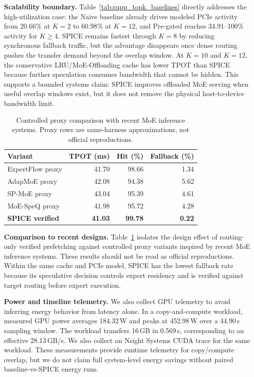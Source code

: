 \textbf{Scalability boundary.}
Table~\ref{tab:supp_topk_baselines} directly addresses the high-utilization
case: the Naive baseline already drives modeled PCIe activity from 20.66\% at
$K{=}2$ to 60.98\% at $K{=}12$, and Pre-gated reaches 34.91--100\% activity for
$K{\ge}4$. SPICE remains fastest through $K{=}8$ by reducing synchronous
fallback traffic, but the advantage disappears once dense routing pushes the
transfer demand beyond the overlap window. At $K{=}10$ and $K{=}12$, the
conservative LRU/MoE-Offloading cache has lower TPOT than SPICE because further
speculation consumes bandwidth that cannot be hidden. This supports a bounded
systems claim: SPICE improves offloaded MoE serving when useful overlap windows
exist, but it does not remove the physical host-to-device bandwidth limit.

\begin{table}[t]
\centering
\caption{Controlled proxy comparison with recent MoE inference systems. Proxy
rows are same-harness approximations, not official reproductions.}
\label{tab:supp_proxy}
\scriptsize
\begin{tabular}{lrrr}
\toprule
Variant & TPOT (ms) & Hit (\%) & Fallback (\%) \\
\midrule
ExpertFlow proxy & 41.70 & 98.66 & 1.34 \\
AdapMoE proxy & 42.08 & 94.38 & 5.62 \\
SP-MoE proxy & 43.04 & 95.39 & 4.61 \\
MoE-SpeQ proxy & 41.98 & 95.72 & 4.28 \\
\textbf{SPICE verified} & \textbf{41.03} & \textbf{99.78} & \textbf{0.22} \\
\bottomrule
\end{tabular}
\end{table}

\textbf{Comparison to recent designs.}
Table~\ref{tab:supp_proxy} isolates the design effect of routing-only verified
prefetching against controlled proxy variants inspired by recent MoE inference
systems. These results should not be read as official reproductions. Within the
same cache and PCIe model, SPICE has the lowest fallback rate because its
speculative decision controls expert residency and is verified against target
routing before expert execution.

\textbf{Power and timeline telemetry.}
We also collect GPU telemetry to avoid inferring energy behavior from latency
alone. In a copy-and-compute workload, measured GPU power averages 184.32\,W
and peaks at 452.98\,W over a 44.90\,s sampling window. The workload transfers
16\,GB in 0.569\,s, corresponding to an effective 28.13\,GB/s. We also collect
an Nsight Systems CUDA trace for the same workload. These measurements provide
runtime telemetry for copy/compute overlap, but we do not claim full
system-level energy savings without paired baseline-vs-SPICE energy runs.
